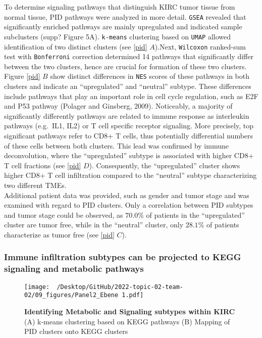 \documentclass[
  parskip,
  oneside]{scrreprt}
\begin{document}
To determine signaling pathways that distinguish KIRC tumor tissue from
normal tissue, PID pathways were analyzed in more detail. \texttt{GSEA}
revealed that significantly enriched pathways are mainly upregulated and
indicated sample subclusters (supp? Figure 5A). \texttt{k-means}
clustering based on \texttt{UMAP} allowed identification of two distinct
clusters (see \cref{pid} \(A\)).Next, \texttt{Wilcoxon} ranked-sum test
with \texttt{Bonferroni} correction determined 14 pathways that
significantly differ between the two clusters, hence are crucial for
formation of these two clusters. Figure \cref{pid} \(B\) show distinct
differences in \texttt{NES} scores of these pathways in both clusters
and indicate an ``upregulated'' and ``neutral'' subtype. These
differences include pathways that play an important role in cell cycle
regulation, such as E2F and P53 pathway (Polager and Ginsberg, 2009).
Noticeably, a majority of significantly differently pathways are related
to immune response as interleukin pathways (e.g.~IL1, IL2) or T cell
specific receptor signaling. More precisely, top significant pathways
refer to CD8+ T cells, thus potentially differential numbers of these
cells between both clusters. This lead was confirmed by immune
deconvolution, where the ``upregulated'' subtype is associated with
higher CD8+ T cell fractions (see \cref{pid} \(D\)). Consequently, the
``upregulated'' cluster shows higher CD8+ T cell infiltration compared
to the ``neutral'' subtype characterizing two different TMEs.\\
Additional patient data was provided, such as gender and tumor stage and
was examined with regard to PID clusters. Only a correlation between PID
subtypes and tumor stage could be observed, as \(70.0\%\) of patients in
the ``upregulated'' cluster are tumor free, while in the ``neutral''
cluster, only \(28.1\%\) of patients characterize as tumor free (see
\cref{pid} \(C\)).

\hypertarget{immune-infiltration-subtypes-can-be-projected-to-kegg-signaling-and-metabolic-pathways}{%
\subsubsection{Immune infiltration subtypes can be projected to KEGG
signaling and metabolic
pathways}\label{immune-infiltration-subtypes-can-be-projected-to-kegg-signaling-and-metabolic-pathways}}

\begin{figure}[h]
  \texttt{[image: ~/Desktop/GitHub/2022-topic-02-team-02/09\_figures/Panel2\_Ebene 1.pdf]}
  \caption{\textbf{Identifying Metabolic and Signaling subtypes within KIRC} (A) k-means clustering based on KEGG pathways (B) Mapping of PID clusters onto KEGG clusters}
  \label{kegg}
\end{figure}
\end{document}
